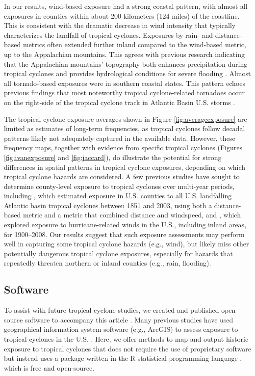 In our results, wind-based exposure had a strong coastal pattern, with almost
all exposures in counties within about 200 kilometers (124 miles) of the
coastline. This is consistent with the
dramatic decrease in wind intensity that typically characterizes the landfall
of tropical cyclones. Exposures by rain- and distance-based metrics often extended further inland compared to the wind-based
metric, up to the Appalachian mountains. This agrees with previous research
indicating that the Appalachian mountains' topography both enhances
precipitation during tropical cyclones and provides hydrological conditions for
severe flooding \citep{rees2001}.  Almost all tornado-based exposures were in
southern coastal states. This pattern echoes
previous findings that most noteworthy tropical cyclone-related tornadoes occur
on the right-side of the tropical cyclone track in Atlantic Basin U.S. storms
\citep{moore2012}.

The tropical cyclone exposure averages shown in Figure
\ref{fig:averageexposure} are limited as estimates of long-term frequencies, as
tropical cyclones follow decadal patterns \citep{kossin2007more} likely not
adequately captured in the available data. However, these frequency maps,
together with evidence from specific tropical cyclones (Figures
\ref{fig:ivanexposure} and \ref{fig:jaccard}),  do illustrate the potential for
strong differences in spatial patterns in tropical cyclone exposures, depending
on which tropical cyclone hazards are considered. A few previous studies have
sought to determine county-level exposure to tropical cyclones over multi-year
periods, including \citet{zandbergen2009}, which estimated exposure in U.S.
counties to all U.S.  landfalling Atlantic basin tropical cyclones between 1851
and 2003, using both a distance-based metric and a metric that combined
distance and windspeed, and \citet{kruk2010}, which explored exposure to
hurricane-related winds in the U.S., including inland areas, for 1900--2008.
Our results suggest that such exposure assessments may perform well in
capturing some tropical cyclone hazards (e.g., wind), but likely miss other
potentially dangerous tropical cyclone exposures, especially for hazards that
repeatedly threaten northern or inland counties (e.g., rain, flooding).
 
\subsection*{Software}

To assist with future tropical cyclone studies, we created and published
open source software to accompany this article \citep{hurricaneexposure,
hurricaneexposuredata}. Many previous studies have used geographical
information system software (e.g., ArcGIS) to assess exposure to tropical
cyclones in the U.S. \citep{grabich2016, zandbergen2009, czajkowski2011,
kruk2010}. Here, we offer methods to map and output historic exposure to
tropical cyclones that does not require the use of proprietary software but
instead uses a package written in the R statistical programming language
\citep{R}, which is free and open-source.

